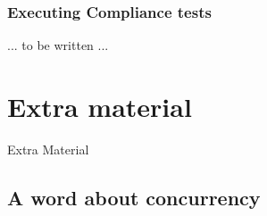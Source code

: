 \documentclass[aspectratio=169]{beamer}
\newcommand{\slidefont}{\scriptsize}
\begin{document}

\begin{frame}
  \frametitle{Executing Compliance tests}

  ... to be written ...
\end{frame}


\section{Extra material}


\begin{frame}

  \slidefont

  \vfill

  \begin{center}\LARGE
    Extra Material
  \end{center}

  \vfill

\end{frame}


\subsection{A word about concurrency}

\end{document}
